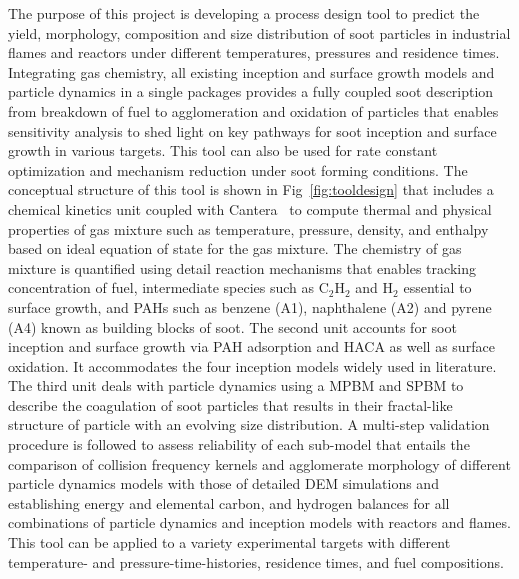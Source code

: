The purpose of this project is developing a process design tool to predict the yield, morphology, composition and size distribution of soot particles in industrial flames and reactors under different temperatures, pressures and residence times. Integrating gas chemistry, all existing inception and surface growth models and particle dynamics in a single packages provides a fully coupled soot description from breakdown of fuel to agglomeration and oxidation of particles that enables sensitivity analysis to shed light on key pathways for soot inception and surface growth in various targets. This tool can also be used for rate constant optimization and mechanism reduction under soot forming conditions. The conceptual structure of this tool is shown in Fig~\ref{fig:tooldesign} that includes a chemical kinetics unit coupled with Cantera~\citep{cantera} to compute thermal and physical properties of gas mixture such as temperature, pressure, density, and enthalpy based on ideal equation of state for the gas mixture. The chemistry of gas mixture is quantified using detail reaction mechanisms that enables tracking concentration of fuel, intermediate species such as $\mathrm{C_2H_2}$ and $\mathrm{H_2}$ essential to surface growth, and PAHs such as benzene (A1), naphthalene (A2) and pyrene (A4) known as building blocks of soot. The second unit accounts for soot inception and surface growth via PAH adsorption and HACA as well as surface oxidation. It accommodates the four inception models widely used in literature. The third unit deals with particle dynamics using a MPBM and SPBM to describe the coagulation of soot particles that results in their fractal-like structure of particle with an evolving size distribution. A multi-step validation procedure is followed to assess reliability of each sub-model that entails the comparison of collision frequency kernels and agglomerate morphology of different particle dynamics models with those of detailed DEM simulations and establishing energy and elemental carbon, and hydrogen balances for all combinations of particle dynamics and inception models with reactors and flames. This tool can be applied to a variety experimental targets with different temperature- and pressure-time-histories, residence times, and fuel compositions.  

